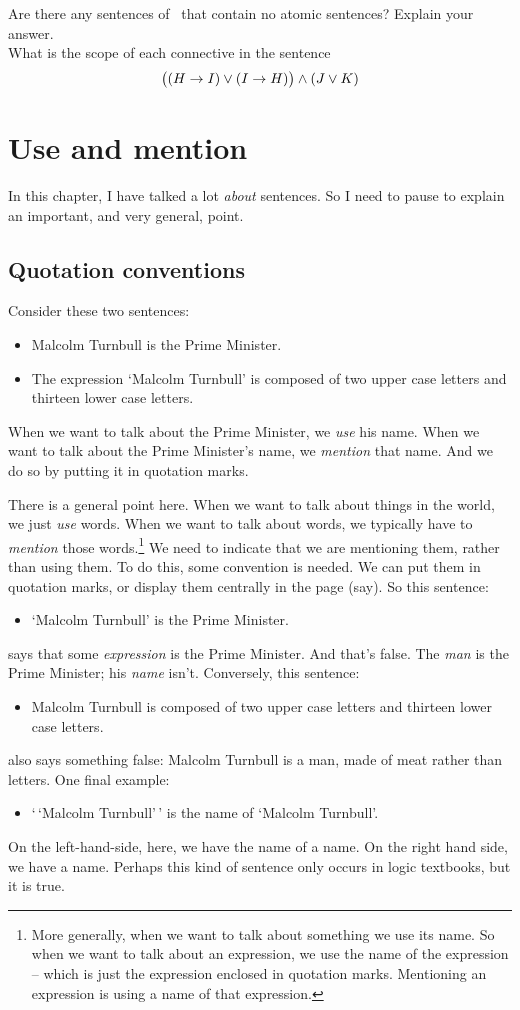 \problempart
Are there any sentences of \TFL\ that contain no atomic sentences? Explain your answer.\\

\problempart
What is the scope of each connective in the sentence
$$\bigl( (H \rightarrow I) \vee (I \rightarrow H) \bigr) \wedge (J \vee K)$$


\chapter{Use and mention}\label{s:UseMention}
In this chapter, I have talked a lot \emph{about} sentences. So I need to pause to explain an important, and very general, point.

\section{Quotation conventions}
Consider these two sentences:
	\begin{itemize}
		\item Malcolm Turnbull is the Prime Minister.
		\item The expression `Malcolm Turnbull' is composed of two upper case letters and thirteen lower case letters.
	\end{itemize}
When we want to talk about the Prime Minister, we \emph{use} his name. When we want to talk about the Prime Minister's name, we \emph{mention} that name. And we do so by putting it in quotation marks.

There is a general point here. When we want to talk about things in the world, we just \emph{use} words. When we want to talk about words, we typically have to \emph{mention} those words.\footnote{More generally, when we want to talk about something we use its name. So when we want to talk about an expression, we use the name of the expression – which is just the expression enclosed in quotation marks. Mentioning an expression is using a name of that expression.} We need to indicate that we are mentioning them, rather than using them. To do this, some convention is needed. We can put them in quotation marks, or display them centrally in the page (say). So this sentence:
	\begin{itemize}
		\item `Malcolm Turnbull' is the Prime Minister.
	\end{itemize}
says that some \emph{expression} is the Prime Minister. And that's false. The \emph{man} is the Prime Minister; his \emph{name} isn't. Conversely, this sentence:
	\begin{itemize}
		\item Malcolm Turnbull is composed of two upper case letters and thirteen lower case letters.
	\end{itemize}
also says something false: Malcolm Turnbull is a man, made of meat rather than letters. One final example:
	\begin{itemize}
		\item `\,`Malcolm Turnbull'\,' is the name of `Malcolm Turnbull'.
	\end{itemize} 
On the left-hand-side, here, we have the name of a name. On the right hand side, we have a name. Perhaps this kind of sentence only occurs in logic textbooks, but it is true. 

